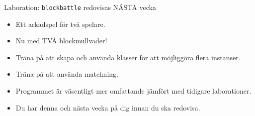 \begin{SlideExtra}{Laboration: \texttt{blockbattle} redovisas NÄSTA vecka}
\begin{minipage}{0.55\textwidth}
    \begin{itemize}
      \item Ett arkadspel för två spelare.
      \item Nu med TVÅ blockmullvader!
      \item Träna på att skapa och använda klasser för att möjliggöra flera instanser.
      \item Träna på att använda matchning.
      \item Programmet är väsentligt mer omfattande jämfört med tidigare laborationer.
      \item Du har denna och nästa vecka på dig innan du ska redovisa.
    \end{itemize}    
  \end{minipage}
  \end{SlideExtra}
  
\fi
